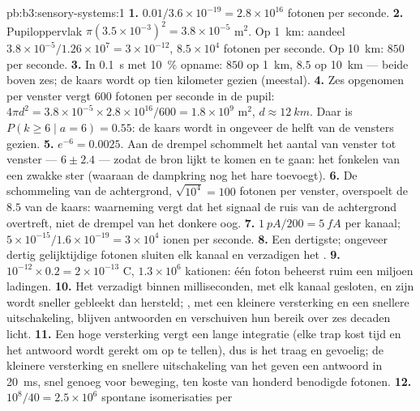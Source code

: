 \begin{solution}{pb:b3:sensory-systems:1}
\textbf{1.} $0.01/3.6\times 10^{-19} = 2.8\times 10^{16}$ fotonen per
seconde.
\textbf{2.} Pupiloppervlak $\pi(3.5\times 10^{-3})^{2} = 3.8\times 10^{-5}$
m$^{2}$. Op \qty{1}{km}: aandeel $3.8\times 10^{-5}/1.26\times 10^{7} =
3\times 10^{-12}$, $8.5\times 10^{4}$ fotonen per seconde. Op
\qty{10}{km}: $850$ per seconde.
\textbf{3.} In \qty{0.1}{s} met \qty{10}{\%} opname: $850$ op
\qty{1}{km}, $8.5$ op \qty{10}{km} --- beide boven zes; de kaars wordt
op tien kilometer gezien (meestal).
\textbf{4.} Zes opgenomen per venster vergt $600$ fotonen per seconde in
de pupil: $4\pi d^{2} = 3.8\times 10^{-5}\times 2.8\times 10^{16}/600
= 1.8\times 10^{9}$ m$^{2}$, $d \approx \qty{12}{km}$. Daar is $P(k \ge
6 \mid a = 6) = 0.55$: de kaars wordt in ongeveer de helft van de
vensters gezien.
\textbf{5.} $e^{-6} = 0.0025$. Aan de drempel schommelt het aantal van
venster tot venster --- $6 \pm 2.4$ --- zodat de bron lijkt te komen en
te gaan: het fonkelen van een zwakke ster (waaraan de dampkring nog het
hare toevoegt).
\textbf{6.} De schommeling van de achtergrond, $\sqrt{10^{4}} = 100$
fotonen per venster, overspoelt de $8.5$ van de kaars: waarneming vergt
dat het signaal de ruis van de achtergrond overtreft, niet de drempel
van het donkere oog.
\textbf{7.} $\qty{1}{pA}/200 = \qty{5}{fA}$ per kanaal; $5\times
10^{-15}/1.6\times 10^{-19} = 3\times 10^{4}$ ionen per seconde.
\textbf{8.} Een dertigste; ongeveer dertig gelijktijdige fotonen sluiten
elk kanaal en verzadigen het .
\textbf{9.} $10^{-12}\times 0.2 = 2\times 10^{-13}$ C, $1.3\times 10^{6}$
kationen: één foton beheerst ruim een miljoen ladingen.
\textbf{10.} Het  verzadigt binnen milliseconden, met elk kanaal
gesloten, en zijn  wordt sneller gebleekt dan hersteld;
, met een kleinere versterking en een snellere uitschakeling,
blijven antwoorden en verschuiven hun bereik over zes decaden licht.
\textbf{11.} Een hoge versterking vergt een lange integratie (elke trap
kost tijd en het antwoord wordt gerekt om op te tellen), dus is het
 traag en gevoelig; de kleinere versterking en snellere
uitschakeling van het  geven een antwoord in \qty{20}{ms}, snel
genoeg voor beweging, ten koste van honderd benodigde fotonen.
\textbf{12.} $10^{8}/40 = 2.5\times 10^{6}$ spontane isomerisaties per

\end{solution}
